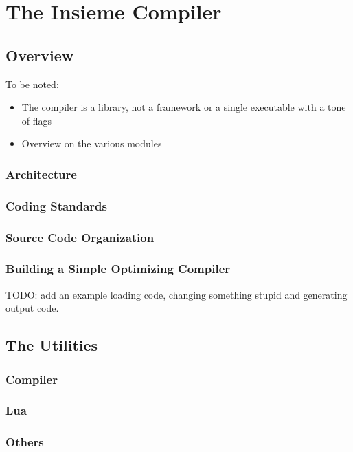\chapter{The Insieme Compiler} \label{cap:compiler}

\section{Overview}

To be noted:
\begin{itemize}
  \item The compiler is a library, not a framework or a single executable with a
  tone of flags
  \item Overview on the various modules
\end{itemize}

\subsection{Architecture}
\subsection{Coding Standards} \label{sec:compiler:codingstandards}
\subsection{Source Code Organization}
\subsection{Building a Simple Optimizing Compiler}
\label{cap:compiler:sec:overview:sub:building} TODO: add an example loading
code, changing something stupid and generating output code.

\section{The Utilities}
 

\subsection{Compiler}
\subsection{Lua}
\subsection{Others}
